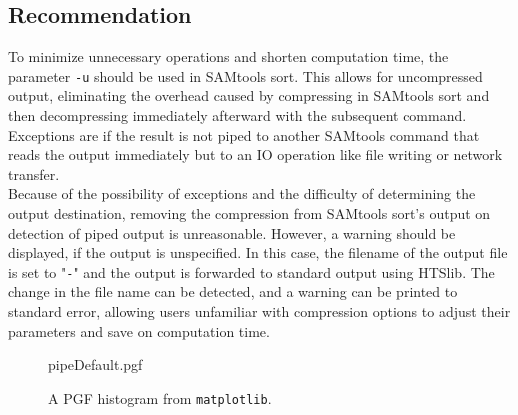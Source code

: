 \subsection{Recommendation}
To minimize unnecessary operations and shorten computation time, the parameter \texttt{-u} should be used in SAMtools sort. This allows for uncompressed output, eliminating the overhead caused by compressing in SAMtools sort and then decompressing immediately afterward with the subsequent command. \\
Exceptions are if the result is not piped to another SAMtools command that reads the output immediately but to an IO operation like  file writing or network transfer. \\
Because of the possibility of exceptions and the difficulty of determining the output destination, removing the compression from SAMtools sort's output on detection of piped output is unreasonable. However, a warning should be displayed, if the output is unspecified. In this case, the filename of the output file is set to "\texttt{-}" and the output is forwarded to standard output using HTSlib. The change in the file name can be detected, and a warning can be printed to standard error, allowing users unfamiliar with compression options to adjust their parameters and save on computation time.

\begin{figure}
    \begin{center}
        {pipeDefault.pgf}
    \end{center}
    \caption{A PGF histogram from \texttt{matplotlib}.}
\end{figure}



